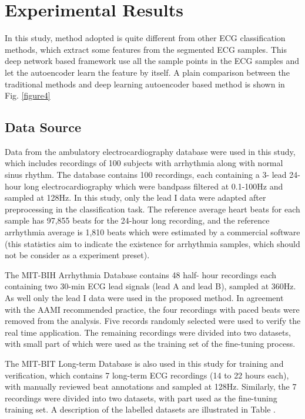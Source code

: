 \documentclass[journal]{IEEEtran}
\begin{document}
\section{Experimental Results}

In this study, method adopted is quite different from other ECG classification methods, which extract some features from the segmented ECG samples. This deep network based framework use all the sample points in the ECG samples and let the autoencoder learn the feature by itself. A plain comparison between the traditional methods and deep learning autoencoder based method is shown in Fig. \ref{figure4}

\subsection{Data Source}
Data from the ambulatory electrocardiography database were used in this study, which includes recordings of 100 subjects with arrhythmia along with normal sinus rhythm. The database contains 100 recordings, each containing a 3- lead 24-hour long electrocardiography which were bandpass filtered at 0.1-100Hz and sampled at 128Hz. In this study, only the lead I data were adapted after preprocessing in the classification task. The reference average heart beats for each sample has 97,855 beats for the 24-hour long recording, and the reference arrhythmia average is 1,810 beats which were estimated by a commercial software (this statistics aim to indicate the existence for arrhythmia samples, which should not be consider as a experiment preset).

The MIT-BIH Arrhythmia Database \cite{physionet} contains 48 half- hour recordings each containing two 30-min ECG lead signals (lead A and lead B), sampled at 360Hz. As well only the lead I data were used in the proposed method. In agreement with the AAMI recommended practice, the four recordings with paced beats were removed from the analysis. Five records randomly selected were used to verify the real time application. The remaining recordings were divided into two datasets, with small part of which were used as the training set of the fine-tuning process.

The MIT-BIT Long-term Database is also used in this study for training and verification, which contains 7 long-term ECG recordings (14 to 22 hours each), with manually reviewed beat annotations and sampled at 128Hz. Similarly, the 7 recordings were divided into two datasets, with part used as the fine-tuning training set. A description of the labelled datasets are illustrated in Table  \uppercase\expandafter{} .
\end{document}
